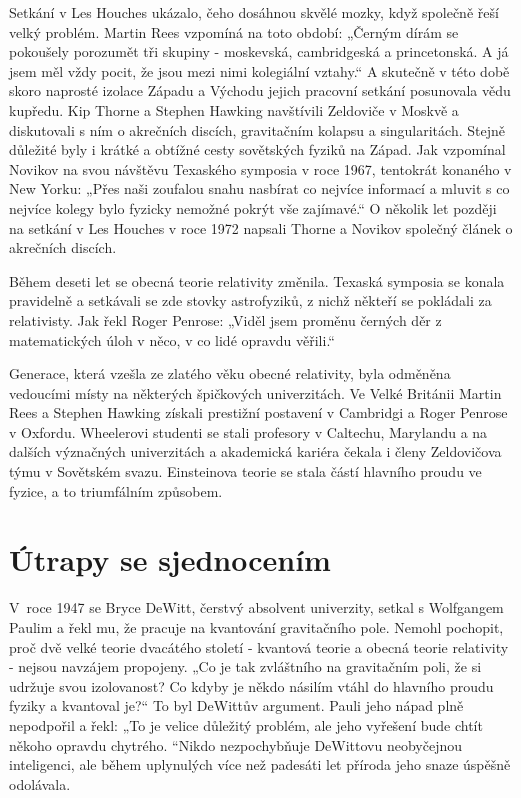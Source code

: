   Setkání v Les Houches ukázalo, čeho dosáhnou skvělé mozky, když společně řeší velký problém.
  Martin Rees vzpomíná na toto období: „Černým dírám se pokoušely porozumět tři skupiny - moskevská,
  cambridgeská a princetonská. A já jsem měl vždy pocit, že jsou mezi nimi kolegiální vztahy.“ A
  skutečně v této době skoro naprosté izolace Západu a Východu jejich pracovní setkání posunovala
  vědu kupředu. Kip Thorne a Stephen Hawking navštívili Zeldoviče v Moskvě a diskutovali s ním o
  akrečních discích, gravitačním kolapsu a singularitách. Stejně důležité byly i krátké a obtížné
  cesty sovětských fyziků na Západ. Jak vzpomínal Novikov na svou návštěvu Texaského symposia v roce
  1967, tentokrát konaného v New Yorku: „Přes naši zoufalou snahu nasbírat co nejvíce informací a
  mluvit s co nejvíce kolegy bylo fyzicky nemožné pokrýt vše zajímavé.“ O několik let později na
  setkání v Les Houches v roce 1972 napsali Thorne a Novikov společný článek o akrečních discích. 

  Během deseti let se obecná teorie relativity změnila. Texaská symposia se konala pravidelně a
  setkávali se zde stovky astrofyziků, z nichž někteří se pokládali za relativisty. Jak řekl Roger
  Penrose: „Viděl jsem proměnu černých děr z matematických úloh v něco, v co lidé opravdu věřili.“

  Generace, která vzešla ze zlatého věku obecné relativity, byla odměněna vedoucími místy na
  některých špičkových univerzitách. Ve Velké Británii Martin Rees a Stephen Hawking získali
  prestižní postavení v Cambridgi a Roger Penrose v Oxfordu. Wheelerovi studenti se stali profesory
  v Caltechu, Marylandu a na dalších význačných univerzitách a akademická kariéra čekala i členy
  Zeldovičova týmu v Sovětském svazu. Einsteinova teorie se stala částí hlavního proudu ve fyzice, a
  to triumfálním způsobem. 

\section{Útrapy se sjednocením}\label{feyIchIIIsecX}
  V roce 1947 se Bryce DeWitt, čerstvý absolvent univerzity, setkal s Wolfgangem Paulim a řekl mu,
  že pracuje na kvantování gravitačního pole. Nemohl pochopit, proč dvě velké teorie dvacátého
  století - kvantová teorie a obecná teorie relativity - nejsou navzájem propojeny. „Co je tak
  zvláštního na gravitačním poli, že si udržuje svou izolovanost? Co kdyby je někdo násilím vtáhl do
  hlavního proudu fyziky a kvantoval je?“ To byl DeWittův argument. Pauli jeho nápad plně nepodpořil
  a řekl: „To je velice důležitý problém, ale jeho vyřešení bude chtít někoho opravdu chytrého.
  “Nikdo nezpochybňuje DeWittovu neobyčejnou inteligenci, ale během uplynulých více než padesáti let
  příroda jeho snaze úspěšně odolávala. 
  
